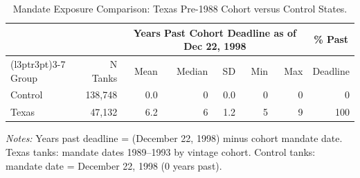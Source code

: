 \begin{table}
    \centering
    \caption{Mandate Exposure Comparison: Texas Pre-1988 Cohort versus Control States.}
    \label{tbl-mandate-exposure}
    \fontsize{10}{12}\selectfont
    \begin{threeparttable}
    \begin{tabular}{lrrrrrrr}
    \toprule
    \multicolumn{2}{c}{ } & \multicolumn{5}{c}{Years Past Cohort Deadline as of Dec 22, 1998} & \multicolumn{1}{c}{\% Past} \\
    \cmidrule(l{3pt}r{3pt}){3-7}
    Group & N Tanks & Mean & Median & SD & Min & Max & Deadline \\
    \midrule
    Control & 138,748 & 0.0 & 0 & 0.0 & 0 & 0 & 0 \\
    Texas   &  47,132 & 6.2 & 6 & 1.2 & 5 & 9 & 100 \\
    \bottomrule
    \end{tabular}
    \begin{tablenotes}[flushleft]
    \footnotesize
    \item \textit{Notes:} Years past deadline = (December 22, 1998) minus cohort mandate date. Texas tanks: mandate dates 1989--1993 by vintage cohort. Control tanks: mandate date = December 22, 1998 (0 years past).
    \end{tablenotes}
    \end{threeparttable}
    \end{table}